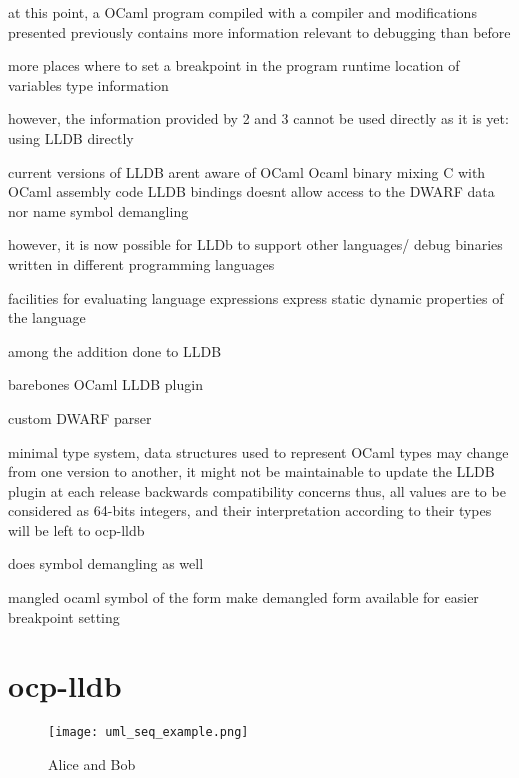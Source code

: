 at this point, a OCaml program compiled with a compiler and modifications
presented previously contains more information relevant to debugging than before

more places where to set a breakpoint in the program
runtime location of variables
type information

however, the information provided by 2 and 3 cannot be used directly as it is yet:
using LLDB directly


current versions of LLDB arent aware of OCaml
Ocaml binary mixing C with OCaml assembly code
LLDB bindings doesnt allow access to the DWARF data nor name symbol demangling

however, it is now possible for LLDb to support other languages/ debug binaries
written in different programming languages

facilities for evaluating language expressions
express static dynamic properties of the language

among the addition done to LLDB

barebones OCaml LLDB plugin

custom DWARF parser

minimal type system, data structures used to represent OCaml types may
    change from one version to another, it might not be maintainable to update
    the LLDB plugin at each release
    backwards compatibility concerns
    thus, all values are to be considered as 64-bits integers, and their
    interpretation according to their types will be left to ocp-lldb

    does symbol demangling as well

    mangled ocaml symbol of the form
    make demangled form available for easier breakpoint setting

\section{ocp-lldb}


\begin{figure}[htb]
  \centering
  \texttt{[image: uml\_seq\_example.png]}\\
  \caption{Alice and Bob}
  \label{fig:aliceandbob}
\end{figure}

